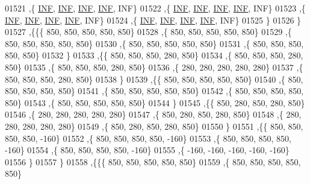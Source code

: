 \begin{DoxyCode}
01521    ,\{   \hyperlink{energy__const_8h_a12c2040f25d8e3a7b9e1c2024c618cb6}{INF},   \hyperlink{energy__const_8h_a12c2040f25d8e3a7b9e1c2024c618cb6}{INF},   \hyperlink{energy__const_8h_a12c2040f25d8e3a7b9e1c2024c618cb6}{INF},   \hyperlink{energy__const_8h_a12c2040f25d8e3a7b9e1c2024c618cb6}{INF},   INF\}
01522    ,\{   \hyperlink{energy__const_8h_a12c2040f25d8e3a7b9e1c2024c618cb6}{INF},   \hyperlink{energy__const_8h_a12c2040f25d8e3a7b9e1c2024c618cb6}{INF},   \hyperlink{energy__const_8h_a12c2040f25d8e3a7b9e1c2024c618cb6}{INF},   \hyperlink{energy__const_8h_a12c2040f25d8e3a7b9e1c2024c618cb6}{INF},   INF\}
01523    ,\{   \hyperlink{energy__const_8h_a12c2040f25d8e3a7b9e1c2024c618cb6}{INF},   \hyperlink{energy__const_8h_a12c2040f25d8e3a7b9e1c2024c618cb6}{INF},   \hyperlink{energy__const_8h_a12c2040f25d8e3a7b9e1c2024c618cb6}{INF},   \hyperlink{energy__const_8h_a12c2040f25d8e3a7b9e1c2024c618cb6}{INF},   INF\}
01524    ,\{   \hyperlink{energy__const_8h_a12c2040f25d8e3a7b9e1c2024c618cb6}{INF},   \hyperlink{energy__const_8h_a12c2040f25d8e3a7b9e1c2024c618cb6}{INF},   \hyperlink{energy__const_8h_a12c2040f25d8e3a7b9e1c2024c618cb6}{INF},   \hyperlink{energy__const_8h_a12c2040f25d8e3a7b9e1c2024c618cb6}{INF},   INF\}
01525    \}
01526   \}
01527  ,\{\{\{   850,   850,   850,   850,   850\}
01528    ,\{   850,   850,   850,   850,   850\}
01529    ,\{   850,   850,   850,   850,   850\}
01530    ,\{   850,   850,   850,   850,   850\}
01531    ,\{   850,   850,   850,   850,   850\}
01532    \}
01533   ,\{\{   850,   850,   850,   280,   850\}
01534    ,\{   850,   850,   850,   280,   850\}
01535    ,\{   850,   850,   850,   280,   850\}
01536    ,\{   280,   280,   280,   280,   280\}
01537    ,\{   850,   850,   850,   280,   850\}
01538    \}
01539   ,\{\{   850,   850,   850,   850,   850\}
01540    ,\{   850,   850,   850,   850,   850\}
01541    ,\{   850,   850,   850,   850,   850\}
01542    ,\{   850,   850,   850,   850,   850\}
01543    ,\{   850,   850,   850,   850,   850\}
01544    \}
01545   ,\{\{   850,   280,   850,   280,   850\}
01546    ,\{   280,   280,   280,   280,   280\}
01547    ,\{   850,   280,   850,   280,   850\}
01548    ,\{   280,   280,   280,   280,   280\}
01549    ,\{   850,   280,   850,   280,   850\}
01550    \}
01551   ,\{\{   850,   850,   850,   850,  -160\}
01552    ,\{   850,   850,   850,   850,  -160\}
01553    ,\{   850,   850,   850,   850,  -160\}
01554    ,\{   850,   850,   850,   850,  -160\}
01555    ,\{  -160,  -160,  -160,  -160,  -160\}
01556    \}
01557   \}
01558  ,\{\{\{   850,   850,   850,   850,   850\}
01559    ,\{   850,   850,   850,   850,   850\}

\end{DoxyCode}
